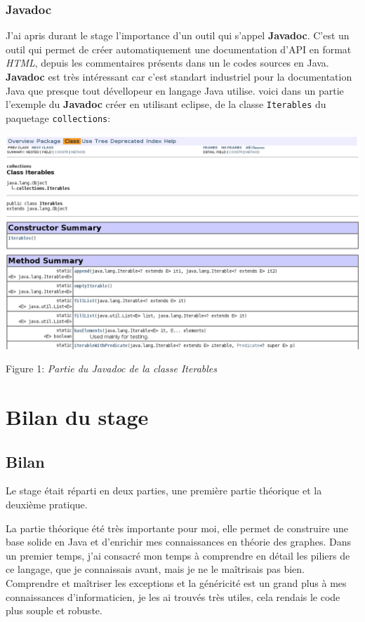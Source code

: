 \documentclass[12pt]{report}
\begin{document}
\subsection{Javadoc}

J'ai apris durant le stage l'importance d'un outil qui s'appel \textbf{Javadoc}. C'est un outil qui permet de créer automatiquement une documentation d'API en format \textit{HTML}, depuis les commentaires présents dans un le codes sources en Java. \textbf{Javadoc} est très intéressant car c'est standart industriel pour la documentation Java que presque tout dévellopeur en langage Java utilise. voici dans un partie l'exemple du \textbf{Javadoc} créer en utilisant eclipse, de la classe \texttt{Iterables} du paquetage \texttt{collections}:

\begin{center}
\includegraphics[width=1.05\textwidth]{Javadoc.png}
\caption{\label{fig:DiagUMLPartie1}}
\newline Figure 1: \textit{Partie du Javadoc de la classe Iterables }
\end{center}


\chapter{Bilan du stage} 

\section{Bilan}

Le stage était réparti en deux parties, une première partie théorique et la deuxième pratique.\newline

La partie théorique été très importante pour moi, elle permet de construire une base solide en Java et d'enrichir mes connaissances en théorie des graphes. Dans un premier temps, j'ai consacré mon temps à comprendre en détail les piliers de ce langage, que je connaissais avant, mais je ne le maîtrisais pas bien. Comprendre et maîtriser les exceptions et la généricité est un grand plus à mes connaissances d'informaticien, je les ai trouvés très utiles, cela rendais le code plus souple et robuste.\newline
\end{document}
